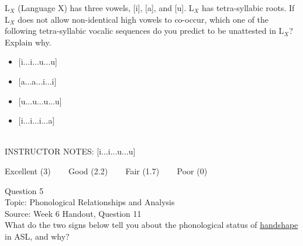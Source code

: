 \documentclass[12pt]{article}
\begin{document}
L$_X$ (Language X) has three vowels, [i], [a], and [u]. L$_X$ has tetra-syllabic roots. If L$_X$ does not allow non-identical high vowels to co-occur, which one of the following tetra-syllabic vocalic sequences do you predict to be unattested in L$_X$? Explain why.\\

\begin{itemize} \item {[i...i...u...u]} \item {[a...a...i...i]} \item {[u...u...u...u]} \item {[i...i...i...a]} \end{itemize}


~\\
INSTRUCTOR NOTES: [i...i...u...u]


\vfill
Excellent (3) ~~~ Good (2.2) ~~~ Fair (1.7) ~~~ Poor (0)
\newpage

{\large Question 5}\\

Topic: Phonological Relationships and Analysis\\
Source: Week 6 Handout, Question 11\\

What do the two signs below tell you about the phonological status of \underline{handshape} in ASL, and why?\\
\end{document}
